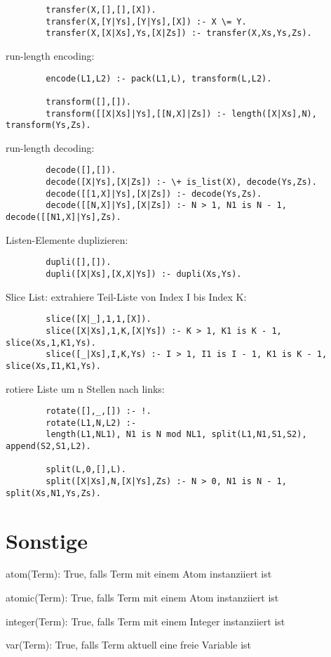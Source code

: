 \begin{compactitem}
\begin{lstlisting}
		transfer(X,[],[],[X]).
		transfer(X,[Y|Ys],[Y|Ys],[X]) :- X \= Y.
		transfer(X,[X|Xs],Ys,[X|Zs]) :- transfer(X,Xs,Ys,Zs).
		\end{lstlisting}		
	\item run-length encoding:	
		\begin{lstlisting}
		encode(L1,L2) :- pack(L1,L), transform(L,L2).
		
		transform([],[]).
		transform([[X|Xs]|Ys],[[N,X]|Zs]) :- length([X|Xs],N), transform(Ys,Zs).
		\end{lstlisting}	
	\item run-length decoding:
		\begin{lstlisting}
		decode([],[]).
		decode([X|Ys],[X|Zs]) :- \+ is_list(X), decode(Ys,Zs).
		decode([[1,X]|Ys],[X|Zs]) :- decode(Ys,Zs).
		decode([[N,X]|Ys],[X|Zs]) :- N > 1, N1 is N - 1, decode([[N1,X]|Ys],Zs).
		\end{lstlisting}
	\item Listen-Elemente duplizieren: 	
		\begin{lstlisting}
		dupli([],[]).
		dupli([X|Xs],[X,X|Ys]) :- dupli(Xs,Ys).
		\end{lstlisting}
	\item Slice List: extrahiere Teil-Liste von Index I bis Index K:
		\begin{lstlisting}
		slice([X|_],1,1,[X]).
		slice([X|Xs],1,K,[X|Ys]) :- K > 1, K1 is K - 1, slice(Xs,1,K1,Ys).
		slice([_|Xs],I,K,Ys) :- I > 1, I1 is I - 1, K1 is K - 1, slice(Xs,I1,K1,Ys).
		\end{lstlisting}
	\item rotiere Liste um n Stellen nach links:
		\begin{lstlisting}
		rotate([],_,[]) :- !.
		rotate(L1,N,L2) :-
		length(L1,NL1), N1 is N mod NL1, split(L1,N1,S1,S2), append(S2,S1,L2).
		
		split(L,0,[],L).
		split([X|Xs],N,[X|Ys],Zs) :- N > 0, N1 is N - 1, split(Xs,N1,Ys,Zs).
		\end{lstlisting}	
\end{compactitem}

\section{Sonstige}
\begin{compactitem}
	\item atom(Term): True, falls Term mit einem Atom instanziiert ist 
	\item atomic(Term): True, falls Term mit einem Atom instanziiert ist 
	\item integer(Term): True, falls Term mit einem Integer instanziiert ist
	\item var(Term): True, falls Term aktuell eine freie Variable ist
\end{compactitem}